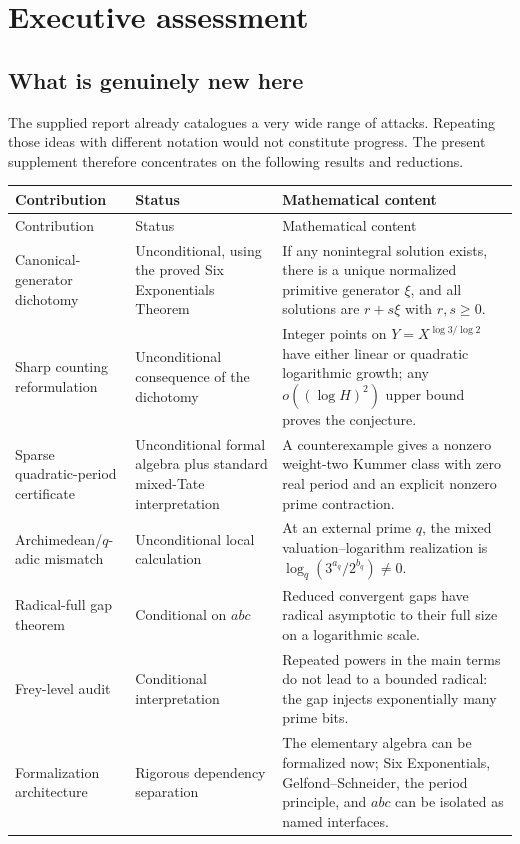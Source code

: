 \documentclass[11pt,oneside]{article}
\theoremstyle{definition}
\begin{document}
\tableofcontents
\newpage

\section{Executive assessment}

\subsection{What is genuinely new here}

The supplied report already catalogues a very wide range of attacks.  Repeating those ideas with different notation would not constitute progress.  The present supplement therefore concentrates on the following results and reductions.

\begin{longtable}{>{\raggedright\arraybackslash}p{} >{\raggedright\arraybackslash}p{} >{\raggedright\arraybackslash}p{}}
\toprule
Contribution & Status & Mathematical content\\
\midrule
\endfirsthead
\toprule
Contribution & Status & Mathematical content\\
\midrule
\endhead
Canonical-generator dichotomy & Unconditional, using the proved Six Exponentials Theorem & If any nonintegral solution exists, there is a unique normalized primitive generator $\xi$, and all solutions are $r+s\xi$ with $r,s\ge 0$.\\
\addlinespace
Sharp counting reformulation & Unconditional consequence of the dichotomy & Integer points on $Y=X^{\log3/\log2}$ have either linear or quadratic logarithmic growth; any $o((\log H)^2)$ upper bound proves the conjecture.\\
\addlinespace
Sparse quadratic-period certificate & Unconditional formal algebra plus standard mixed-Tate interpretation & A counterexample gives a nonzero weight-two Kummer class with zero real period and an explicit nonzero prime contraction.\\
\addlinespace
Archimedean/$q$-adic mismatch & Unconditional local calculation & At an external prime $q$, the mixed valuation--logarithm realization is $\log_q(3^{a_q}/2^{b_q})\ne0$.\\
\addlinespace
Radical-full gap theorem & Conditional on $abc$ & Reduced convergent gaps have radical asymptotic to their full size on a logarithmic scale.\\
\addlinespace
Frey-level audit & Conditional interpretation & Repeated powers in the main terms do not lead to a bounded radical: the gap injects exponentially many prime bits.\\
\addlinespace
Formalization architecture & Rigorous dependency separation & The elementary algebra can be formalized now; Six Exponentials, Gelfond--Schneider, the period principle, and $abc$ can be isolated as named interfaces.\\
\bottomrule
\end{longtable}
\end{document}
